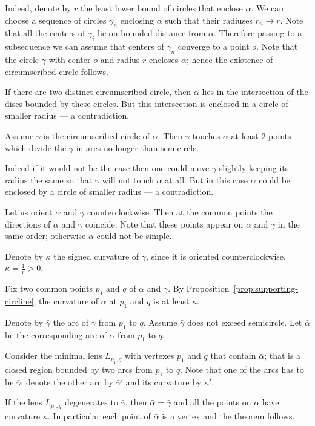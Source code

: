 Indeed, denote by $r$ the least lower bound of circles that enclose $\alpha$.
We can choose a sequence of circles $\gamma_n$ enclosing $\alpha$ such that their radiuses $r_n\to r$.
Note that all the centers of $\gamma_i$ lie on bounded distance from $\alpha$.
Therefore passing to a subsequence we can assume that centers of $\gamma_n$ converge to a point $o$.
Note that the circle $\gamma$ with center $o$ and radius $r$ encloses $\alpha$;
hence the existence of circumscribed circle follows.

If there are two distinct circumscribed circle, then $\alpha$ lies in the intersection of the discs bounded by these circles.
But this intersection is enclosed in a circle of smaller radius --- a contradiction.

\begin{clm}{}
Assume $\gamma$ is the circumscribed circle of $\alpha$.
Then $\gamma$ touches $\alpha$ at least $2$ points which divide the $\gamma$ in arcs no longer than semicircle.
\end{clm}

Indeed if it would not be the case then one could move $\gamma$ slightly keeping its radius the same so that $\gamma$ will not touch $\alpha$ at all.
But in this case $\alpha$ could be enclosed by a circle of smaller radius --- a contradiction.

Let us orient $\alpha$ and $\gamma$ counterclockwise.
Then at the common points the directions of $\alpha$ and $\gamma$ coincide.
Note that these points appear on $\alpha$ and $\gamma$ in the same order;
otherwise $\alpha$ could not be simple.

Denote by $\kappa$ the signed curvature of $\gamma$, since it is oriented counterclockwise,
$\kappa=\tfrac1r>0$.

Fix two common points $p_1$ and $q$ of $\alpha$ and $\gamma$.
By Proposition~\ref{prop:supporting-circline}, the curvature of $\alpha$ at $p_1$ and $q$ is at least $\kappa$.

Denote by $\bar \gamma$ the arc of $\gamma$ from $p_1$ to $q$.
Assume $\bar\gamma$ does not exceed semicircle.
Let $\bar\alpha$ be the corresponding arc of $\alpha$  from $p_1$ to $q$.

Consider the minimal lens $L_{p_1,q}$ with vertexes $p_1$ and $q$ that contain $\bar\alpha$;
that is a closed region bounded by two arcs from $p_1$ to $q$.
Note that one of the arcs has to be $\bar\gamma$;
denote the other arc by $\bar\gamma'$ and its curvature by $\kappa'$.

If the lens $L_{p_1,q}$ degenerates to $\bar \gamma$, 
then $\bar\alpha=\bar\gamma$ and all the points on $\alpha$ have curvature $\kappa$.
In particular each point of $\bar\alpha$ is a vertex and the theorem follows.

